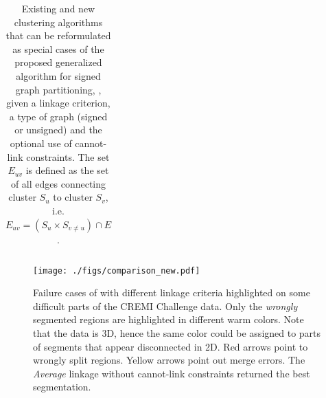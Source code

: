 \begin{table}[t]
\begin{subtable}[t!]{\textwidth}
\begin{tabular}{c | c  c  c  c  c}
            
             


             







            
        \end{tabular}
    \end{subtable} 
    \caption{Existing and new clustering algorithms that can be reformulated as special cases of the proposed generalized algorithm for signed graph partitioning, \algname{}, given a linkage criterion, a type of graph (signed or unsigned) and the optional use of cannot-link constraints. The set $E_{uv}$ is defined as the set of all edges connecting cluster $S_u$ to cluster $S_v$, i.e. $E_{uv}=(S_u \times S_{v \neq u}) \cap E$.}
    \label{tab:linkage-criteria}
\end{table}

\begin{figure}
\centering
\texttt{[image: ./figs/comparison\_new.pdf]} %
\caption{Failure cases of \algname{} with different linkage criteria highlighted on some difficult parts of the CREMI Challenge data. Only the \emph{wrongly} segmented regions are highlighted in different warm colors. Note that the data is 3D, hence the same color could be assigned to parts of segments that appear disconnected in 2D.  Red arrows point to wrongly split regions. Yellow arrows point out merge errors. The \emph{Average} linkage without cannot-link constraints returned the best segmentation.
\label{fig:cremi_comparison}}
\end{figure}
